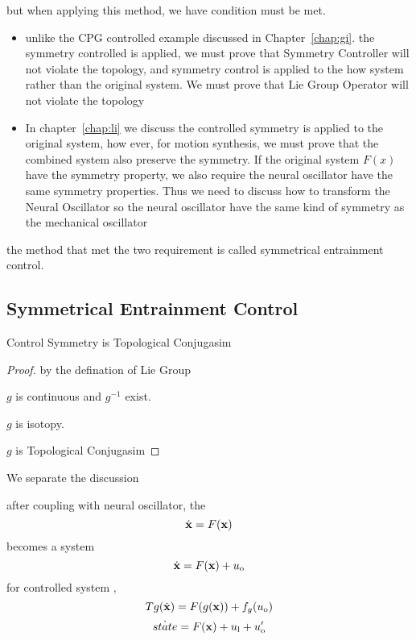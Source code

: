 but when applying this method, we have condition must be met.
\begin{itemize}
\item unlike the CPG controlled example discussed in Chapter~\ref{chap:gi}.
the symmetry controlled is applied, we must prove that Symmetry Controller will not violate the topology, and symmetry control is applied to the how system rather than the original system.
We must prove that Lie Group Operator will not violate the topology

\item In chapter~\ref{chap:li} we discuss the controlled symmetry is applied to the original system, how ever, for motion synthesis, we must prove that the combined system also preserve the symmetry.
If the original system $F(x)$ have the symmetry property, we also require the neural oscillator have the same symmetry properties.
Thus we need to discuss how to transform the Neural Oscillator so the neural oscillator have the same kind of symmetry as the mechanical oscillator
\end{itemize}

the method that met the two requirement is called symmetrical entrainment control.


\subsection{Symmetrical Entrainment Control}

\begin{mythe}
Control Symmetry is Topological Conjugasim
\end{mythe}
\begin{proof}
by the defination of Lie Group

$g$ is continuous and $g^{-1}$ exist.

$g$ is isotopy.

$g$ is Topological Conjugasim

\end{proof}


We separate the discussion

after coupling with neural oscillator, the 
\[
\dot{\mathbf{x}}=F(\mathbf{x})
\]
becomes a system 
\begin{equation}
\label{eq:gc}
\dot{\mathbf{x}}=F(\mathbf{x})+u_{\mathrm{o}}
\end{equation}
for controlled system , 
\begin{equation}
\label{eq:cc}
Tg(\dot{\mathbf{x}})=F(g(\mathbf{x}))+f_g(u_{\mathrm{o}})
\end{equation}
\begin{equation}
\label{eq:con}
\dot{state}=F(\mathbf{x})+u_{\mathrm{l}}+u_{\mathrm{o}}'
\end{equation}

